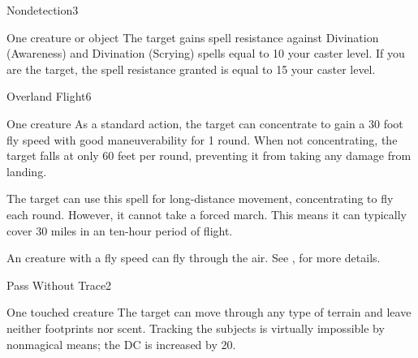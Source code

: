\begin{spellsection}{Nondetection}{3}
\spelldur \durext \dismissable
\begin{spelltarget}{One creature or object}
    \spelleffect The target gains spell resistance against Divination (Awareness) and Divination (Scrying) spells equal to 10 \add your caster level. If you are the target, the spell resistance granted is equal to 15 \add your caster level.
\end{spelltarget}
\end{spellsection}

\begin{spellsection}{Overland Flight}{6}
\spelldur \durext
\begin{spelltarget}{One creature}
    \spelleffect As a standard action, the target can concentrate to gain a 30 foot fly speed with good maneuverability for 1 round. When not concentrating, the target falls at only 60 feet per round, preventing it from taking any damage from landing.

    The target can use this spell for long-distance movement, concentrating to fly each round. However, it cannot take a forced march. This means it can typically cover 30 miles in an ten-hour period of flight.
\end{spelltarget}
\spellnotes An \unencumbered creature with a fly speed can fly through the air. See , for more details.
\end{spellsection}

\begin{spellsection}{Pass Without Trace}{2}
\spelldur \durlong \dismissable
\begin{spelltarget}{One touched creature}
    \spelleffect The target can move through any type of terrain and leave neither footprints nor scent. Tracking the subjects is virtually impossible by nonmagical means; the DC is increased by 20.
\end{spelltarget}
\end{spellsection}

